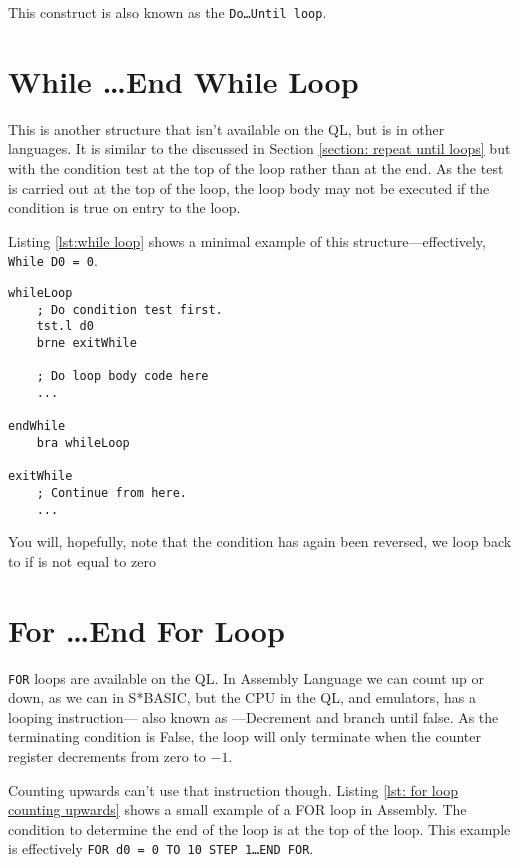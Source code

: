 This construct is also known as the \texttt{Do\ldots{}Until loop}.

\section{While \ldots\protect End While Loop}\label{section: while loops}

This is another structure that isn't available on the QL, but is in other languages. It is similar to the  discussed in Section \ref{section: repeat until loops} but with the condition test at the top of the loop rather than at the end. As the test is carried out at the top of the loop, the loop body may not be executed if the condition is true on entry to the loop.

Listing \ref{lst:while loop} shows a minimal example of this structure---effectively, \texttt{While D0 = 0}.

\begin{lstlisting}[caption={WHILE \ldots END WHILE},label={lst:while loop}]
whileLoop
    ; Do condition test first.
    tst.l d0
    brne exitWhile

    ; Do loop body code here
    ...
    
endWhile
    bra whileLoop

exitWhile
    ; Continue from here.
    ...
\end{lstlisting}

You will, hopefully, note that the condition has again been reversed, we loop back to  if  is not equal to zero

\section{For \ldots\protect End For Loop}

\texttt{FOR} loops are available on the QL. In Assembly Language we can count up or down, as we can in S*BASIC, but the CPU in the QL, and emulators, has a looping instruction--- also known as ---Decrement  and branch until false. As the terminating condition is False, the loop will only terminate when the counter register decrements from zero to $-1$.

Counting upwards can't use that instruction though. Listing \ref{lst: for loop counting upwards} shows a small example of a FOR loop in Assembly. The condition to determine the end of the loop is at the top of the loop. This example is effectively \texttt{FOR d0 = 0 TO 10 STEP 1\ldots{}END FOR}.

